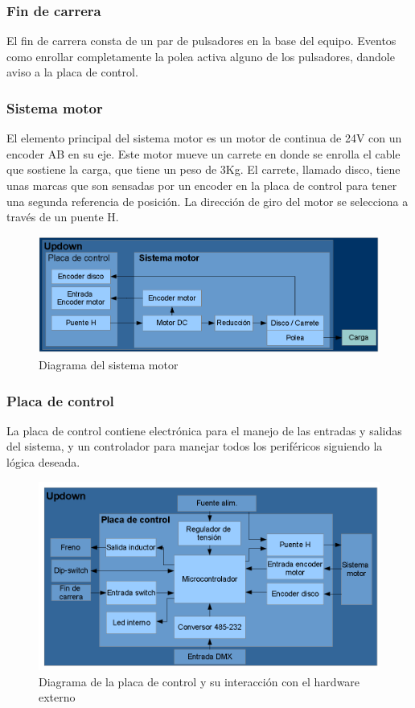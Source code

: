 \subsubsection{Fin de carrera}
El fin de carrera consta de un par de pulsadores en la base del equipo. Eventos como enrollar completamente la polea activa alguno de los pulsadores, dandole aviso a la placa de control.

\subsubsection{Sistema motor}
El elemento principal del sistema motor es un motor de continua de 24V con un encoder AB en su eje. Este motor mueve un carrete en donde se enrolla el cable que sostiene la carga, que tiene un peso de 3Kg. El carrete, llamado disco, tiene unas marcas que son sensadas por un encoder en la placa de control para tener una segunda referencia de posición. La dirección de giro del motor se selecciona a través de un puente H.

\begin{figure}[!ht]
	\centering
	\includegraphics[width=15cm,scale=1]{resources/1_11-diagramaSistemaMotor.png}
	\caption{Diagrama del sistema motor}
	\label{fig:\thefigure}
\end{figure}

\subsubsection{Placa de control}
La placa de control contiene electrónica para el manejo de las entradas y salidas del sistema, y un controlador para manejar todos los periféricos siguiendo la lógica deseada.\\

\begin{figure}[!ht]
	\centering
	\includegraphics[width=15cm,scale=1]{resources/1_12-diagramaPlacaControl.png}
	\caption{Diagrama de la placa de control y su interacción con el hardware externo}
	\label{fig:\thefigure}
\end{figure}


